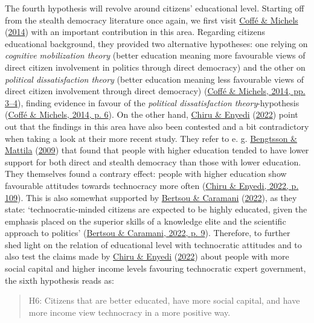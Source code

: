 \documentclass[
  12pt,
  english,
]{article}
\begin{document}
The fourth hypothesis will revolve around citizens' educational level.
Starting off from the stealth democracy literature once again, we first
visit \protect\hyperlink{ref-coffe2014education}{Coffé \& Michels}
(\protect\hyperlink{ref-coffe2014education}{2014}) with an important
contribution in this area. Regarding citizens educational background,
they provided two alternative hypotheses: one relying on \emph{cognitive
mobilization theory} (better education meaning more favourable views of
direct citizen involvement in politics through direct democracy) and the
other on \emph{political dissatisfaction theory} (better education
meaning less favourable views of direct citizen involvement through
direct democracy) (\protect\hyperlink{ref-coffe2014education}{Coffé \&
Michels, 2014, pp. 3--4}), finding evidence in favour of the
\emph{political dissatisfaction theory}-hypothesis
(\protect\hyperlink{ref-coffe2014education}{Coffé \& Michels, 2014, p.
6}). On the other hand, \protect\hyperlink{ref-chiru2022wants}{Chiru \&
Enyedi} (\protect\hyperlink{ref-chiru2022wants}{2022}) point out that
the findings in this area have also been contested and a bit
contradictory when taking a look at their more recent study. They refer
to e. g. \protect\hyperlink{ref-bengtsson2009direct}{Bengtsson \&
Mattila} (\protect\hyperlink{ref-bengtsson2009direct}{2009}) that found
that people with higher education tended to have lower support for both
direct and stealth democracy than those with lower education. They
themselves found a contrary effect: people with higher education show
favourable attitudes towards technocracy more often
(\protect\hyperlink{ref-chiru2022wants}{Chiru \& Enyedi, 2022, p. 109}).
This is also somewhat supported by
\protect\hyperlink{ref-bertsou2022people}{Bertsou \& Caramani}
(\protect\hyperlink{ref-bertsou2022people}{2022}), as they state:
`technocratic-minded citizens are expected to be highly educated, given
the emphasis placed on the superior skills of a knowledge elite and the
scientific approach to politics'
(\protect\hyperlink{ref-bertsou2022people}{Bertsou \& Caramani, 2022, p.
9}). Therefore, to further shed light on the relation of educational
level with technocratic attitudes and to also test the claims made by
\protect\hyperlink{ref-chiru2022wants}{Chiru \& Enyedi}
(\protect\hyperlink{ref-chiru2022wants}{2022}) about people with more
social capital and higher income levels favouring technocratic expert
government, the sixth hypothesis reads as:

\begin{quote}
H6: Citizens that are better educated, have more social capital, and
have more income view technocracy in a more positive way.
\end{quote}
\end{document}

